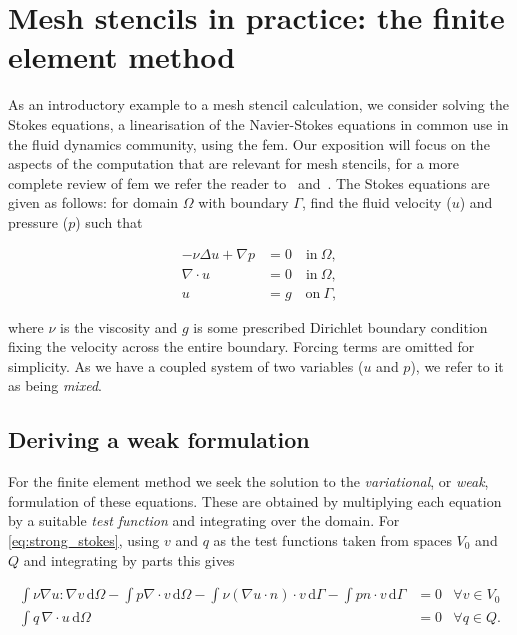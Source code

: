 \documentclass[thesis]{subfiles}
\begin{document}
\section{Mesh stencils in practice: the finite element method}
\label{sec:stokes_equations}

As an introductory example to a mesh stencil calculation, we consider solving the Stokes equations, a linearisation of the Navier-Stokes equations in common use in the fluid dynamics community, using the \gls{fem}.
Our exposition will focus on the aspects of the computation that are relevant for mesh stencils, for a more complete review of \gls{fem} we refer the reader to~\cite{brennerMathematicalTheoryFinite2008} and~\cite{larsonFiniteElementMethod2013}.
The Stokes equations are given as follows: for domain $\Omega$ with boundary $\Gamma$, find the fluid velocity ($u$) and pressure ($p$) such that

\begin{equation} \label{eq:strong_stokes}
  \begin{aligned}
    - \nu \Delta u + \nabla p &= 0 \quad \textrm{in} \ \Omega, \\
    \nabla \cdot u &= 0 \quad \textrm{in} \ \Omega, \\
    u &= g \quad \textrm{on} \ \Gamma,
  \end{aligned}
\end{equation}

where $\nu$ is the viscosity and $g$ is some prescribed Dirichlet boundary condition fixing the velocity across the entire boundary.
Forcing terms are omitted for simplicity.
As we have a coupled system of two variables ($u$ and $p$), we refer to it as being \textit{mixed}.

\subsection{Deriving a weak formulation}

For the finite element method we seek the solution to the \textit{variational}, or \textit{weak}, formulation of these equations.
These are obtained by multiplying each equation by a suitable \textit{test function} and integrating over the domain.
For \cref{eq:strong_stokes}, using $v$ and $q$ as the test functions taken from spaces $V_0$ and $Q$ and integrating by parts this gives

\begin{equation} \label{eq:weak_stokes_full}
  \begin{aligned}
    \int \nu \nabla u : \nabla v \, \textrm{d}\Omega
    - \int p \nabla \cdot v \, \textrm{d}\Omega
    - \int \nu (\nabla u \cdot n) \cdot v \, \textrm{d}\Gamma
    - \int p n \cdot v \, \textrm{d}\Gamma
    &= 0
    &\forall v \in V_0
    \\
    \int q \, \nabla \cdot u \, \textrm{d}\Omega
    &= 0
    &\forall q \in Q.
  \end{aligned}
\end{equation}
\end{document}
